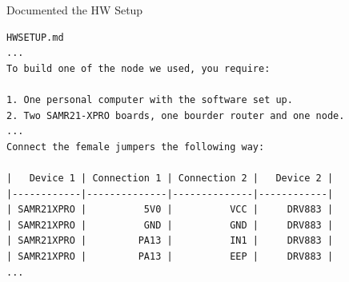 \documentclass[10pt, xcolor=svgnames]{beamer}
\begin{document}
\begin{frame}[fragile]{Documented the HW Setup}
    \begin{verbatim}
HWSETUP.md
...
To build one of the node we used, you require:
        
1. One personal computer with the software set up.
2. Two SAMR21-XPRO boards, one bourder router and one node.
...
Connect the female jumpers the following way:

|   Device 1 | Connection 1 | Connection 2 |   Device 2 |
|------------|--------------|--------------|------------|
| SAMR21XPRO |          5V0 |          VCC |     DRV883 |
| SAMR21XPRO |          GND |          GND |     DRV883 |
| SAMR21XPRO |         PA13 |          IN1 |     DRV883 |
| SAMR21XPRO |         PA13 |          EEP |     DRV883 |
...
    \end{verbatim}
\end{frame}
\end{document}
